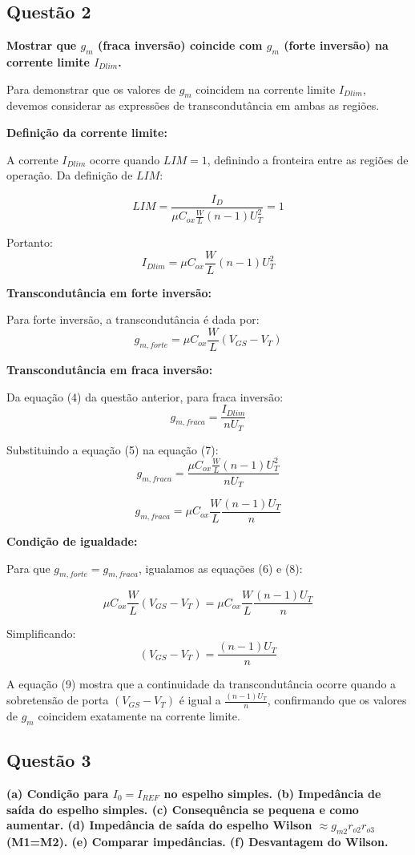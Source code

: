 \documentclass[12pt,a4paper]{article}
\begin{document}
\subsection*{Questão 2}
	\textbf{Mostrar que $g_m$ (fraca inversão) coincide com $g_m$ (forte inversão) na corrente limite $I_{Dlim}$.}

Para demonstrar que os valores de $g_m$ coincidem na corrente limite $I_{Dlim}$, devemos considerar as expressões de transcondutância em ambas as regiões.

\t\textbf{Definição da corrente limite:}

A corrente $I_{Dlim}$ ocorre quando $LIM = 1$, definindo a fronteira entre as regiões de operação. Da definição de $LIM$:

$$LIM = \frac{I_D}{\mu C_{ox} \frac{W}{L} (n-1) U_T^2} = 1$$

Portanto:
$$I_{Dlim} = \mu C_{ox} \frac{W}{L} (n-1) U_T^2 $$

\t\textbf{Transcondutância em forte inversão:}

Para forte inversão, a transcondutância é dada por:
$$g_{m,forte} = \mu C_{ox} \frac{W}{L} (V_{GS} - V_T) $$

\t\textbf{Transcondutância em fraca inversão:}

Da equação (4) da questão anterior, para fraca inversão:
$$g_{m,fraca} = \frac{I_{Dlim}}{nU_T} $$

Substituindo a equação (5) na equação (7):
$$g_{m,fraca} = \frac{\mu C_{ox} \frac{W}{L} (n-1) U_T^2}{nU_T}$$

$$g_{m,fraca} = \mu C_{ox} \frac{W}{L} \frac{(n-1)U_T}{n} $$

\t\textbf{Condição de igualdade:}

Para que $g_{m,forte} = g_{m,fraca}$, igualamos as equações (6) e (8):

$$\mu C_{ox} \frac{W}{L} (V_{GS} - V_T) = \mu C_{ox} \frac{W}{L} \frac{(n-1)U_T}{n}$$

Simplificando:
$$(V_{GS} - V_T) = \frac{(n-1)U_T}{n} $$

A equação (9) mostra que a continuidade da transcondutância ocorre quando a sobretensão de porta $(V_{GS} - V_T)$ é igual a $\frac{(n-1)U_T}{n}$, confirmando que os valores de $g_m$ coincidem exatamente na corrente limite.

\subsection*{Questão 3}
	\textbf{(a) Condição para $I_0 = I_{REF}$ no espelho simples. (b) Impedância de saída do espelho simples. (c) Consequência se pequena e como aumentar. (d) Impedância de saída do espelho Wilson $\approx g_{m2} r_{o2} r_{o3}$ (M1=M2). (e) Comparar impedâncias. (f) Desvantagem do Wilson.}
\end{document}
